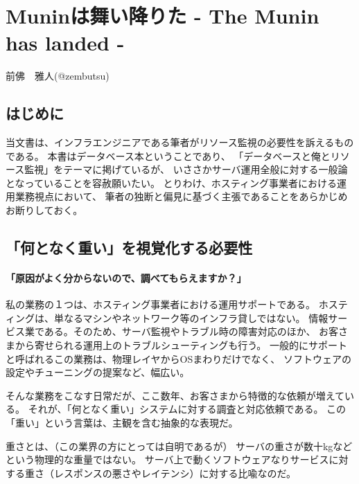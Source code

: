 
\chapter{Muninは舞い降りた - The Munin has landed -}

\begin{flushright}
 前佛　雅人(@zembutsu) %
\end{flushright}

\section{はじめに}

当文書は、インフラエンジニアである筆者がリソース監視の必要性を訴えるものである。
本書はデータベース本ということであり、
「データベースと俺とリソース監視」をテーマに掲げているが、
いささかサーバ運用全般に対する一般論となっていることを容赦願いたい。
とりわけ、ホスティング事業者における運用業務視点において、
筆者の独断と偏見に基づく主張であることをあらかじめお断りしておく。

\section{「何となく重い」を視覚化する必要性}
\subsubsection{「原因がよく分からないので、調べてもらえますか？」}
私の業務の１つは、ホスティング事業者における運用サポートである。
ホスティングは、単なるマシンやネットワーク等のインフラ貸しではない。
情報サービス業である。そのため、サーバ監視やトラブル時の障害対応のほか、
お客さまから寄せられる運用上のトラブルシューティングも行う。
一般的にサポートと呼ばれるこの業務は、物理レイヤからOSまわりだけでなく、
ソフトウェアの設定やチューニングの提案など、幅広い。

そんな業務をこなす日常だが、ここ数年、お客さまから特徴的な依頼が増えている。
それが、「何となく重い」システムに対する調査と対応依頼である。
この「重い」という言葉は、主観を含む抽象的な表現だ。

重さとは、（この業界の方にとっては自明であるが）
サーバの重さが数十kgなどという物理的な重量ではない。
サーバ上で動くソフトウェアなりサービスに対する重さ（レスポンスの悪さやレイテンシ）に対する比喩なのだ。

